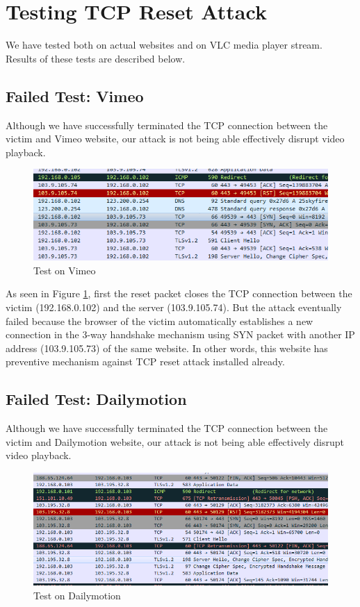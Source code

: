 \documentclass[14pt]{extarticle}
\begin{document}
\section{Testing TCP Reset Attack}
    We have tested both on actual websites and on VLC media player stream. Results of these tests are described below.
    
    \subsection{Failed Test: Vimeo}
        Although we have successfully terminated the TCP connection between the victim and Vimeo website, our attack is not being able effectively disrupt video playback. 
        
        \begin{figure}
            \centering
            \includegraphics[width=.95\textwidth]{Pictures/Vimeo/Vimeo.png}
            \caption{Test on Vimeo}
            \label{fig:vimeo}
        \end{figure}
        
        As seen in Figure \ref{fig:vimeo}, first the reset packet closes the TCP connection between the victim (192.168.0.102) and the server (103.9.105.74). But the attack eventually failed because the browser of the victim automatically establishes a new connection in the 3-way handshake mechanism using SYN packet with another IP address (103.9.105.73) of the same website. In other words, this website has preventive mechanism against TCP reset attack installed already.
        

    \subsection{Failed Test: Dailymotion}
        Although we have successfully terminated the TCP connection between the victim and Dailymotion website, our attack is not being able effectively disrupt video playback.
        
        \begin{figure}[!h]
            \centering
            \includegraphics[width=.95\textwidth]{Pictures/Dailymotion/dm.png}
            \caption{Test on Dailymotion}
            \label{fig:dailymotion}
        \end{figure}
        
\end{document}
